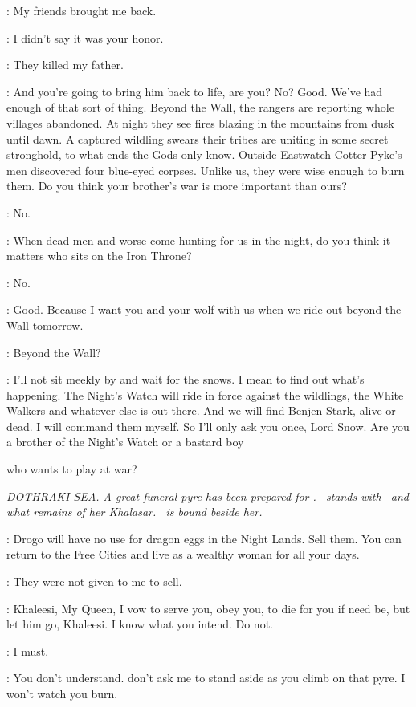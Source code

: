 \JON: My friends brought me back. 

\JEOR: I didn't say it was your honor. 

\JON: They killed my father. 

\JEOR: And you're going to bring him back to life, are you? No? Good. We've had enough of that sort of thing. Beyond the Wall, the rangers are reporting whole villages abandoned. At night they see fires blazing in the mountains from dusk until dawn. A captured wildling swears their tribes are uniting in some secret stronghold, to what ends the Gods only know. Outside Eastwatch Cotter Pyke's men discovered four blue-eyed corpses. Unlike us, they were wise enough to burn them. Do you think your brother's war is more important than ours? 

\JON: No. 

\JEOR: When dead men and worse come hunting for us in the night, do you think it matters who sits on the Iron Throne? 

\JON: No. 

\JEOR: Good. Because I want you and your wolf with us when we ride out beyond the Wall tomorrow. 

\JON: Beyond the Wall? 

\JEOR: I'll not sit meekly by and wait for the snows. I mean to find out what's happening. The Night's Watch will ride in force against the wildlings, the White Walkers and whatever else is out there. And we will find Benjen Stark, alive or dead. I will command them myself. So I'll only ask you once, Lord Snow. Are you a brother of the Night's Watch or a bastard boy 

who wants to play at war? 


\scene

\textit{DOTHRAKI SEA.  A great funeral pyre has been prepared for \DROGO. \DAENERYS ~stands with \JORAH ~and what remains of her Khalasar.  \MIRRI ~is bound beside her.} 

\JORAH: Drogo will have no use for dragon eggs in the Night Lands. Sell them. You can return to the Free Cities and live as a wealthy woman for all your days. 

\DAENERYS: They were not given to me to sell. 

\JORAH: Khaleesi, My Queen, I vow to serve you, obey you, to die for you if need be, but let him go, Khaleesi. I know what you intend. Do not. 

\DAENERYS: I must. 

\JORAH: You don't understand. don't ask me to stand aside as you climb on that pyre. I won't watch you burn. 

